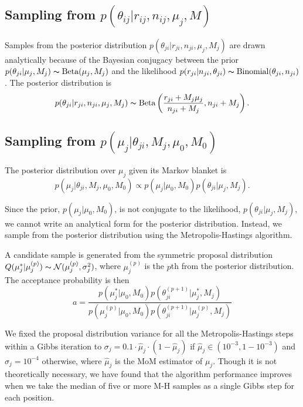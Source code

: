 \documentclass{bioinfo}
\begin{document}
\subsection{Sampling from $p \left( \theta_{ij} |r_{ij},n_{ij},\mu_j,M \right)$}
Samples from the posterior distribution
$p(\theta_{ji} | r_{ji}, n_{ji}, \mu_j, M_j)$
are drawn analytically because of the Bayesian conjugacy between the prior
$p(\theta_{ji} | \mu_j, M_j) \thicksim \text{Beta}(\mu_j, M_j)$
and the likelihood
$p(r_{ji} | n_{ji}, \theta_{ji}) \thicksim \text{Binomial}(\theta_{ji}, n_{ji})$.
The posterior distribution is
\begin{equation}
	p(\theta_{ji} | r_{ji}, n_{ji}, \mu_j, M_j) \thicksim \text{Beta}\left( \frac{r_{ji} + M_j \mu_j}{n_{ji} + M_j} , n_{ji} + M_j\right).
\end{equation}

\subsection{Sampling from $p \left( \mu_j |\theta_{ji},M_j,\mu_0,M_0\right)$}
The posterior distribution over $\mu_j$ given its Markov blanket is
\begin{equation}
	p( \mu_j | \theta_{ji}, M_j, \mu_0, M_0 ) \propto p(\mu_j | \mu_0, M_0) p(\theta_{ji} | \mu_j, M_j).
\end{equation}

Since the prior, $p(\mu_j | \mu_0, M_0)$, is not conjugate to the likelihood, $p(\theta_{ji} | \mu_j, M_j)$, we cannot write an analytical form for the posterior distribution. Instead, we sample from the posterior distribution using the Metropolis-Hastings algorithm.

A candidate sample is generated from the symmetric proposal distribution $Q(\mu_j^* | \mu_j^{(p)}) \thicksim \mathcal{N}(\mu_j^{(p)}, \sigma_j^2)$, where $\mu_j^{(p)}$ is the $p$th from the posterior distribution. The acceptance probability is then
\begin{equation}
	a = \frac{ p(\mu_j^* | \mu_0, M_0) p(\theta^{(p+1)}_{ji} | \mu_j^*, M_j) } {p(\mu_j^{(p)} | \mu_0, M_0) p(\theta^{(p+1)}_{ji} | \mu_j^{(p)}, M_j)}
\end{equation}

We fixed the proposal distribution variance for all the Metropolis-Hastings steps within a Gibbs iteration to $\sigma_j = 0.1 \cdot \hat{\mu}_j\cdot (1-\hat{\mu}_j)$ if $\hat{\mu}_j \in (10^{-3},1-10^{-3})$ and $\sigma_j = 10^{-4}$ otherwise, where $\hat{\mu}_j$ is the MoM estimator of $\mu_j$. Though it is not theoretically necessary, we have found that the algorithm performance improves when we take the median of five or more M-H samples as a single Gibbs step for each position.
\end{document}
